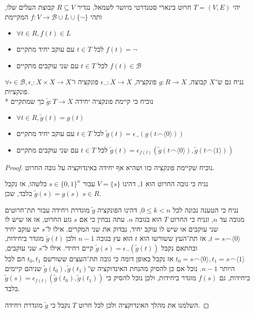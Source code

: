 \Question{}
יהי $T = (V, E)$ חרוט בינארי סטנדרטי מיושר לשמאל, נגדיר $R \subseteq V$ קבוצת העלים שלו, ותהי $f : V \to \mathcal{B} \cup L \cup \{ \lnot \}$ המקיימת
\begin{itemize}
	\item $\forall t \in R, f(t) \in L$
	\item לכל $t \in T$ עם עוקב יחיד מתקיים $f(t) = \lnot$
	\item לכל $t \in T$ עם שני עוקבים מתקיים $f(t) \in \mathcal{B}$
\end{itemize}
נניח גם ש־$X$ קבוצה, $g : R \to X$ פונקציה, $\epsilon_\lnot : X \to X$ פונקציה ו־$\forall \square \in \mathcal{B}, \epsilon_\square : X \times X \to X$ פונקציות. \\*
נוכיח כי קיימת פונקציה יחידה $\tilde{g} : T \to X$ כך שמתקיים
\begin{itemize}
	\item $\forall t \in R, \tilde{g}(t) = g(t)$
	\item לכל $t \in T$ עם עוקב יחיד מתקיים $\tilde{g}(t) = \epsilon_\lnot(g(t \frown \langle 0 \rangle))$
	\item לכל $t \in T$ עם שני עוקבים מתקיים $\tilde{g}(t) = \epsilon_{f(t)}(\tilde{g}(t \frown \langle 0 \rangle), \tilde{g}(t \frown \langle 1 \rangle))$
\end{itemize}
\begin{proof}
	נוכיח שקיימת פונקציה כזו ושהיא אף יחידה באינדוקציה על גובה החרוט.

	נניח כי גובה החרוט הוא 1, דהינו $V = \{ s \}$ עבור $s \in {\{0, 1\}}^n$ כלשהו, אז נקבל $\tilde{g}(s) = g(s)$ בלבד, שכן $s \in R$.

	נניח כי הטענה נכונה לכל $0 \le k < n$, דהינו הפונקציה $\tilde{g}$ מוגדרת ויחידה עבור תת־חרוטים מגובה עד $n$, ונניח כי החרוט $T$ הוא בגובה $n$.
	עתה נבחין כי אם $s$ גזע החרוט, אז או שיש לו שני עוקבים או שיש לו עוקב יחיד, נבדוק את שני המקרים.
	אילו ל־$s$ יש עוקב יחיד $t = s \frown \langle 0 \rangle$, אז תת־העץ ששורשו הוא $t$ הוא עץ בגובה $n - 1$ ולכן $\tilde{g}(t)$ מוגדר ביחידות, ובהתאם נקבל $\tilde{g}(s) = \epsilon_\lnot(\tilde{g}(t))$ קיים ויחידי.
	אילו ל־$s$ שני עוקבים, $t_0 = s \frown \langle 0 \rangle, t_1 = s \frown \langle 1 \rangle$ אז נקבל באופן דומה כי גובה תת־העצים ששורשם $t_0, t_1$ הם לכל היותר $n - 1$.
	נוכל אם כן להסיק מהנחת האינדוקציה ש־$\tilde{g}(t_0), \tilde{g}(t_1)$ שניהם קיימים ביחידות, גם $f(s)$ מוגדר ביחידות, ולכן נוכל להסיק כי $\tilde{g}(s) = \epsilon_{f(t)}(\tilde{g}(t_0), \tilde{g}(t_1))$ בלבד.

	השלמנו את מהלך האינדוקציה ולכן לכל חרוט $T$ נקבל כי $\tilde{g}$ מוגדרת ויחידה.
\end{proof}


